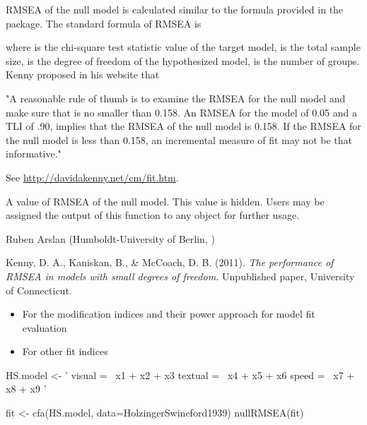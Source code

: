 \documentclass[a4paper]{book}
\begin{document}
%
\begin{Details}\relax
RMSEA of the null model is calculated similar to the formula provided in the  package. The standard formula of RMSEA is 


where  is the chi-square test statistic value of the target model,  is the total sample size,  is the degree of freedom of the hypothesized model,  is the number of groups. Kenny proposed in his website that 

"A reasonable rule of thumb is to examine the RMSEA for the null model and make sure that is no smaller than 0.158. An RMSEA for the model of 0.05 and a TLI of .90, implies that the RMSEA of the null model is 0.158.  If the RMSEA for the null model is less than 0.158, an incremental measure of fit may not be that informative."

See \url{http://davidakenny.net/cm/fit.htm}. 
\end{Details}
%
\begin{Value}
A value of RMSEA of the null model. This value is hidden. Users may be assigned the output of this function to any object for further usage.
\end{Value}
%
\begin{Author}\relax
Ruben Arslan (Humboldt-University of Berlin, )
\end{Author}
%
\begin{References}\relax
Kenny, D. A., Kaniskan, B.,  \& McCoach, D. B. (2011).  \emph{The performance of RMSEA in models with small degrees of freedom.} Unpublished paper, University of Connecticut.
\end{References}
%
\begin{SeeAlso}\relax
\begin{itemize}

\item {} For the modification indices and their power approach for model fit evaluation
\item {} For other fit indices 

\end{itemize}

\end{SeeAlso}
%
\begin{Examples}
\begin{ExampleCode}
HS.model <- ' visual  =~ x1 + x2 + x3
              textual =~ x4 + x5 + x6
              speed   =~ x7 + x8 + x9 '

fit <- cfa(HS.model, data=HolzingerSwineford1939)
nullRMSEA(fit)
\end{ExampleCode}
\end{Examples}
\end{document}
